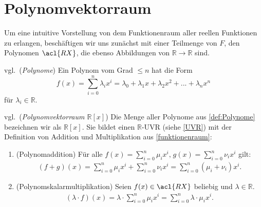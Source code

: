 \section{Polynomvektorraum}
\label{sec:RX}
Um eine intuitive Vorstellung von dem Funktionenraum aller reellen Funktionen zu erlangen, beschäftigen wir uns zunächst mit einer Teilmenge von $F$, den Polynomen $\acl{RX}$, die ebenso Abbildungen von $\mathbb{R}\rightarrow \mathbb{R}$ sind.
\theoremstyle{definition}
\begin{definition}vgl.\,\cite[S. 44, 1.28]{Springer} (\emph{Polynome}) \label{def:Polynome}Ein Polynom vom Grad $\leq n$ hat die Form \[f(x)= \sum\limits_{i=0}^{n} \lambda_i x^i = \lambda_0 + \lambda_1 x + \lambda_2 x^2 + ... + \lambda_n x^n \] für $\lambda_i \in \mathbb{R}$.
\end{definition}

\begin{Satz}vgl.\,\cite[S. 44f., 1.28]{Springer} (\emph{Polynomvektorraum $\mathbb{R}[x]$}) \label{PVR}Die Menge aller Polynome aus \ref{def:Polynome} bezeichnen wir als $\mathbb{R}[x]$. Sie bildet einen $\mathbb{R}$-\acl{UVR} (siehe \ref{UVR}) mit der Definition von Addition und Multiplikation aus \ref{funktionenraum}:
\begin{enumerate}

\item (Polynomaddition) Für alle \(f(x)=\sum\limits_{i=0}^{n} \mu_i x^i\text{,}\; g(x)=\sum \limits_{i=0}^n \nu_i x^i\) gilt:
\begin{align*}(f+g)(x) = \sum_{i=0}^{n}\mu_i x^i + \sum_{i=0}^{n} \nu_i x^i = \sum_{i=0}^{n} (\mu_i + \nu_i)x^i \text{.}\end{align*}
\item (Polynomskalarmultiplikation)
Seien $f(x) \in \acl{RX}$ beliebig und $\lambda \in \mathbb{R}$.
\begin{align*}
(\lambda \cdot f) (x) = \lambda \cdot \sum_{i=0}^{n} \mu_i x^i= \sum_{i=0}^{n} \lambda \cdot \mu_i x^i\text{.}
\end{align*}
\end{enumerate}
\end{Satz}

